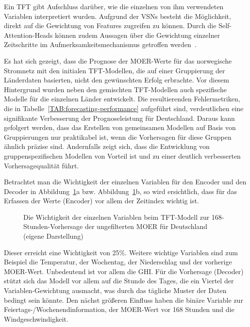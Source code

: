 Ein \ac{TFT} gibt Aufschluss darüber, wie die einzelnen von ihm verwendeten Variablen interpretiert wurden.
Aufgrund der \acp{VSN} besteht die Möglichkeit, direkt auf die Gewichtung von Features zugreifen zu können.
Durch die Self-Attention-Heads können zudem Aussagen über die Gewichtung einzelner Zeitschritte im Aufmerksamkeitsmechanismus getroffen werden~\cite{Joseph.2022}.

Es hat sich gezeigt, dass die Prognose der \ac{MOER}-Werte für das norwegische Stromnetz mit den initialen \ac{TFT}-Modellen, die auf einer Gruppierung der Länderdaten basierten, nicht den gewünschten Erfolg erbrachte.
Vor diesem Hintergrund wurden neben den gemischten \ac{TFT}-Modellen auch spezifische Modelle für die einzelnen Länder entwickelt.
Die resultierenden Fehlermetriken, die in Tabelle~\ref{TAB:forecasting-performance} aufgeführt sind, verdeutlichen eine signifikante Verbesserung der Prognoseleistung für Deutschland.
Daraus kann gefolgert werden, dass das Erstellen von gemeinsamen Modellen auf Basis von Gruppierungen nur praktikabel ist, wenn die Vorhersagen für diese Gruppen ähnlich präzise sind.
Andernfalls zeigt sich, dass die Entwicklung von gruppenspezifischen Modellen von Vorteil ist und zu einer deutlich verbesserten Vorhersagequalität führt.

Betrachtet man die Wichtigkeit der einzelnen Variablen für den Encoder und den Decoder in Abbildung~\ref{FIG:encoder-decoder-interpretation}a bzw. Abbildung~\ref{FIG:encoder-decoder-interpretation}b, so wird ersichtlich, dass für das Erfassen der Werte (Encoder) vor allem der Zeitindex wichtig ist.
\begin{figure}
 \centering
 \qquad
 \caption[TFT Vorhersage Einfluss einzelner Variablen]{Die Wichtigkeit der einzelnen Variablen beim \ac{TFT}-Modell zur 168-Stunden-Vorhersage der ungefilterten \ac{MOER} für Deutschland (eigene Darstellung)}
 \label{FIG:encoder-decoder-interpretation}%
\end{figure}
Dieser erreicht eine Wichtigkeit von 25\%.
Weitere wichtige Variablen sind zum Beispiel die Temperatur, der Wochentag, der Niederschlag und der vorherige \ac{MOER}-Wert.
Unbedeutend ist vor allem die \ac{GHI}.
Für die Vorhersage (Decoder) stützt sich das Modell vor allem auf die Stunde des Tages, die ein Viertel der Variablen-Gewichtung ausmacht, was durch das tägliche Muster der Daten bedingt sein könnte.
Den nächst größeren Einfluss haben die binäre Variable zur Feiertags-/Wochenendinformation, der \ac{MOER}-Wert vor 168 Stunden und die Windgeschwindigkeit.


